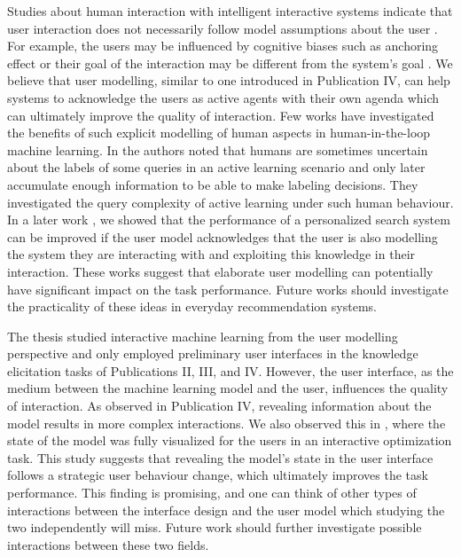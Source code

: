 \documentclass[dissertation,math,vertlayout,pdfa,colorlinks]{aaltoseries}
\begin{document}
Studies about human interaction with intelligent interactive systems indicate that user interaction does not necessarily follow model assumptions about the user \cite{OHagan06,bias_warning,Fabio2020}. For example, the users may be influenced by cognitive biases such as anchoring effect \cite{OHagan06,bias_warning} or their goal of the interaction may be different from the system's goal \cite{Fabio2020}. We believe that user modelling, similar to one introduced in Publication IV, can help systems to acknowledge the users as active agents with their own agenda which can ultimately improve the quality of interaction. Few works have investigated the benefits of such explicit modelling of human aspects in human-in-the-loop machine learning. In \cite{NIPS2016_6155} the authors noted that humans are sometimes uncertain about the labels of some queries in an active learning scenario and only later accumulate enough information to be able to make labeling decisions. They investigated the query complexity of active learning under such human behaviour. In a later work \cite{peltola2019machine}, we showed that the performance of a personalized search system can be improved if the user model acknowledges that the user is also modelling the system they are interacting with and exploiting this knowledge in their interaction. These works suggest that elaborate user modelling can potentially have significant impact on the task performance. Future works should investigate the practicality of these ideas in everyday recommendation systems.  

The thesis studied interactive machine learning from the user modelling perspective and only employed preliminary user interfaces in the knowledge elicitation tasks of Publications II, III, and IV. However, the user interface, as the medium between the machine learning model and the user, influences the quality of interaction. As observed in Publication IV, revealing information about the model results in more complex interactions. We also observed this in \cite{Fabio2020}, where the state of the model was fully visualized for the users in an interactive optimization task. This study suggests that revealing the model's state in the user interface follows a strategic user behaviour change, which ultimately improves the task performance. This finding is promising, and one can think of other types of interactions between the interface design and the user model which studying the two independently will miss. Future work should further investigate possible interactions between these two fields. %
\end{document}
